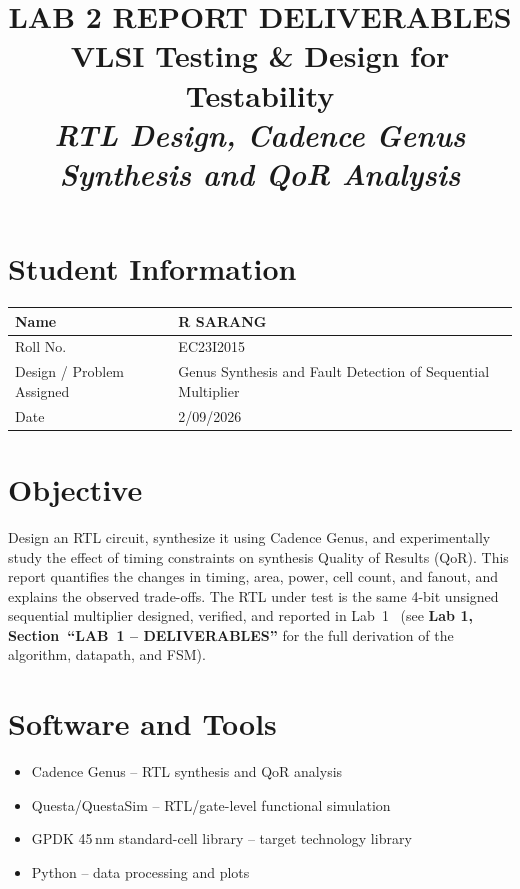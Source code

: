 \documentclass[11pt]{article}
\title{\textbf{LAB 2 REPORT DELIVERABLES}\\[4pt]
\large VLSI Testing \& Design for Testability\\[2pt]
\normalsize\itshape RTL Design, Cadence Genus Synthesis and QoR Analysis}
\author{}
\date{}
\newcommand{\lab}[1]{\textbf{Lab 1, Section~#1}}
\begin{document}
\maketitle
\vspace{-2cm}

\section*{Student Information}
\begin{tabular}{|p{4cm}|p{9cm}|}
\hline
Name & R SARANG \\ \hline
Roll No. & EC23I2015 \\ \hline
Design / Problem Assigned & Genus Synthesis and Fault Detection of Sequential Multiplier \\ \hline
Date & 2/09/2026 \\ \hline
\end{tabular}

\section{Objective}
Design an RTL circuit, synthesize it using Cadence Genus, and experimentally study the effect of
timing constraints on synthesis Quality of Results (QoR). This report quantifies the changes in
timing, area, power, cell count, and fanout, and explains the observed trade-offs. The RTL under
test is the same 4-bit unsigned sequential multiplier designed, verified, and reported in
Lab~1~\cite{lab1} (see \lab{``LAB~1 -- DELIVERABLES''} for the full derivation of the algorithm,
datapath, and FSM).

\section{Software and Tools}
\begin{itemize}
    \item Cadence Genus -- RTL synthesis and QoR analysis
    \item Questa/QuestaSim -- RTL/gate-level functional simulation
    \item GPDK 45\,nm standard-cell library -- target technology library
    \item Python -- data processing and plots
\end{itemize}
\end{document}
